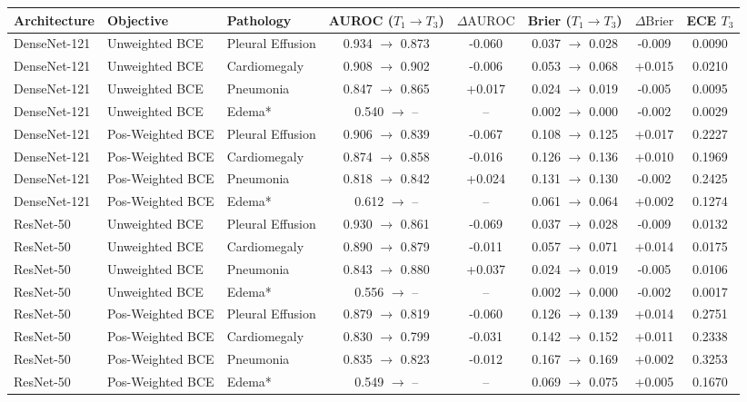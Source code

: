 \begin{tabular}{lllccccc}
\toprule
\textbf{Architecture} & \textbf{Objective} & \textbf{Pathology} & \textbf{AUROC ($T_1 \to T_3$)} & \textbf{$\Delta\text{AUROC}$} & \textbf{Brier ($T_1 \to T_3$)} & \textbf{$\Delta\text{Brier}$} & \textbf{ECE $T_3$} \\
\midrule
DenseNet-121 & Unweighted BCE & Pleural Effusion & 0.934 $\to$ 0.873 & -0.060 & 0.037 $\to$ 0.028 & -0.009 & 0.0090 \\
DenseNet-121 & Unweighted BCE & Cardiomegaly & 0.908 $\to$ 0.902 & -0.006 & 0.053 $\to$ 0.068 & +0.015 & 0.0210 \\
DenseNet-121 & Unweighted BCE & Pneumonia & 0.847 $\to$ 0.865 & +0.017 & 0.024 $\to$ 0.019 & -0.005 & 0.0095 \\
DenseNet-121 & Unweighted BCE & Edema* & 0.540 $\to$ -- & -- & 0.002 $\to$ 0.000 & -0.002 & 0.0029 \\
\midrule
DenseNet-121 & Pos-Weighted BCE & Pleural Effusion & 0.906 $\to$ 0.839 & -0.067 & 0.108 $\to$ 0.125 & +0.017 & 0.2227 \\
DenseNet-121 & Pos-Weighted BCE & Cardiomegaly & 0.874 $\to$ 0.858 & -0.016 & 0.126 $\to$ 0.136 & +0.010 & 0.1969 \\
DenseNet-121 & Pos-Weighted BCE & Pneumonia & 0.818 $\to$ 0.842 & +0.024 & 0.131 $\to$ 0.130 & -0.002 & 0.2425 \\
DenseNet-121 & Pos-Weighted BCE & Edema* & 0.612 $\to$ -- & -- & 0.061 $\to$ 0.064 & +0.002 & 0.1274 \\
\midrule
ResNet-50 & Unweighted BCE & Pleural Effusion & 0.930 $\to$ 0.861 & -0.069 & 0.037 $\to$ 0.028 & -0.009 & 0.0132 \\
ResNet-50 & Unweighted BCE & Cardiomegaly & 0.890 $\to$ 0.879 & -0.011 & 0.057 $\to$ 0.071 & +0.014 & 0.0175 \\
ResNet-50 & Unweighted BCE & Pneumonia & 0.843 $\to$ 0.880 & +0.037 & 0.024 $\to$ 0.019 & -0.005 & 0.0106 \\
ResNet-50 & Unweighted BCE & Edema* & 0.556 $\to$ -- & -- & 0.002 $\to$ 0.000 & -0.002 & 0.0017 \\
\midrule
ResNet-50 & Pos-Weighted BCE & Pleural Effusion & 0.879 $\to$ 0.819 & -0.060 & 0.126 $\to$ 0.139 & +0.014 & 0.2751 \\
ResNet-50 & Pos-Weighted BCE & Cardiomegaly & 0.830 $\to$ 0.799 & -0.031 & 0.142 $\to$ 0.152 & +0.011 & 0.2338 \\
ResNet-50 & Pos-Weighted BCE & Pneumonia & 0.835 $\to$ 0.823 & -0.012 & 0.167 $\to$ 0.169 & +0.002 & 0.3253 \\
ResNet-50 & Pos-Weighted BCE & Edema* & 0.549 $\to$ -- & -- & 0.069 $\to$ 0.075 & +0.005 & 0.1670 \\
\bottomrule
\end{tabular}

